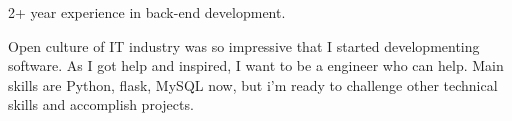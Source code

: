 

\begin{cvparagraph}

2+ year experience in back-end development.

Open culture of IT industry was so impressive that I started developmenting software. As I got help and inspired, I want to be a engineer who can help.
Main skills are Python, flask, MySQL now, but i'm ready to challenge other technical skills and accomplish projects.

\end{cvparagraph}
